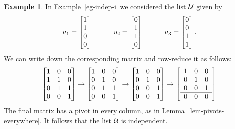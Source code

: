 \documentclass[reqno]{amsart}
\theoremstyle{definition}
\newtheorem{example}[theorem]{Example}
\begin{document}
\begin{example}\label{eg-indep-i-matrix}
 In Example~\ref{eg-indep-i} we considered the list $\mathcal{U}$ given by
 \[ u_1 = \left[\begin{matrix} 1 \\ 1 \\ 0 \\ 0 \end{matrix}\right] \hspace{3em}
    u_2 = \left[\begin{matrix} 0 \\ 1 \\ 1 \\ 0 \end{matrix}\right] \hspace{3em}
    u_3 = \left[\begin{matrix} 0 \\ 0 \\ 1 \\ 1 \end{matrix}\right].
 \]
 We can write down the corresponding matrix and row-reduce it as
 follows:
 \[
  \left[\begin{matrix}
   1 & 0 & 0 \\
   1 & 1 & 0 \\
   0 & 1 & 1 \\
   0 & 0 & 1
  \end{matrix}\right]
  \to
  \left[\begin{matrix}
   1 & 0 & 0 \\
   0 & 1 & 0 \\
   0 & 1 & 1 \\
   0 & 0 & 1
  \end{matrix}\right]
  \to
  \left[\begin{matrix}
   1 & 0 & 0 \\
   0 & 1 & 0 \\
   0 & 0 & 1 \\
   0 & 0 & 1
  \end{matrix}\right]
  \to
  \left[\begin{array}{ccc}
   1 & 0 & 0 \\
   0 & 1 & 0 \\
   0 & 0 & 1 \\ \hline
   0 & 0 & 0
  \end{array}\right]
 \]
 The final matrix has a pivot in every column, as in
 Lemma~\ref{lem-pivots-everywhere}.  It follows that the list $\mathcal{U}$ is
 independent.
\end{example}
\end{document}
